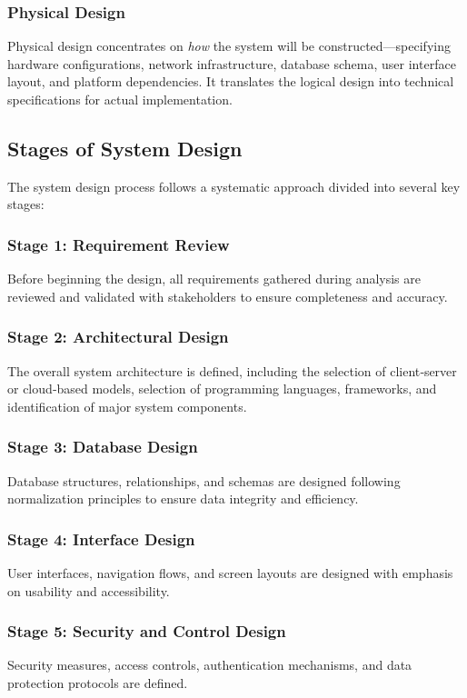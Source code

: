 \documentclass[12pt,a4paper]{article}
\begin{document}
\subsubsection{Physical Design}
Physical design concentrates on \textit{how} the system will be constructed—specifying hardware configurations, network infrastructure, database schema, user interface layout, and platform dependencies.  It translates the logical design into technical specifications for actual implementation.

\subsection{Stages of System Design}
The system design process follows a systematic approach divided into several key stages:

\subsubsection{Stage 1: Requirement Review}
Before beginning the design, all requirements gathered during analysis are reviewed and validated with stakeholders to ensure completeness and accuracy.

\subsubsection{Stage 2: Architectural Design}
The overall system architecture is defined, including the selection of client‑server or cloud‑based models, selection of programming languages, frameworks, and identification of major system components.

\subsubsection{Stage 3: Database Design}
Database structures, relationships, and schemas are designed following normalization principles to ensure data integrity and efficiency.

\subsubsection{Stage 4: Interface Design}
User interfaces, navigation flows, and screen layouts are designed with emphasis on usability and accessibility.

\subsubsection{Stage 5: Security and Control Design}
Security measures, access controls, authentication mechanisms, and data protection protocols are defined.
\end{document}
